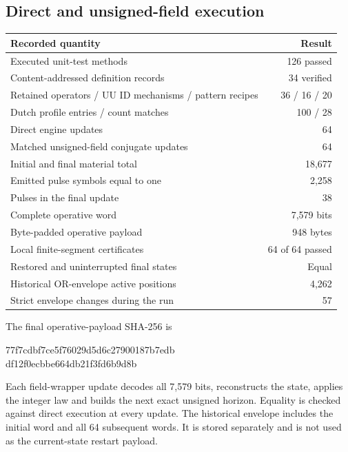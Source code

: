 \documentclass[11pt,a4paper]{article}
\numberwithin{equation}{section}
\begin{document}
\subsection{Direct and unsigned-field execution}
\begin{center}
\begin{tabularx}{\textwidth}{@{}Xr@{}}
\toprule\textbf{Recorded quantity} & \textbf{Result}\\\midrule
Executed unit-test methods & 126 passed\\
Content-addressed definition records & 34 verified\\
Retained operators / UU ID mechanisms / pattern recipes & 36 / 16 / 20\\
Dutch profile entries / count matches & 100 / 28\\
Direct engine updates & 64\\
Matched unsigned-field conjugate updates & 64\\
Initial and final material total & 18,677\\
Emitted pulse symbols equal to one & 2,258\\
Pulses in the final update & 38\\
Complete operative word & 7,579 bits\\
Byte-padded operative payload & 948 bytes\\
Local finite-segment certificates & 64 of 64 passed\\
Restored and uninterrupted final states & Equal\\
Historical OR-envelope active positions & 4,262\\
Strict envelope changes during the run & 57\\
\bottomrule
\end{tabularx}
\end{center}

The final operative-payload SHA-256 is
\begin{center}\small\ttfamily
77f7cdbf7ce5f76029d5d6c27900187b7edb\\
df12f0ecbbe664db21f3fd6b9d8b
\end{center}
Each field-wrapper update decodes all 7,579 bits, reconstructs the state, applies the integer law and builds the next exact unsigned horizon. Equality is checked against direct execution at every update. The historical envelope includes the initial word and all 64 subsequent words. It is stored separately and is not used as the current-state restart payload.
\end{document}
